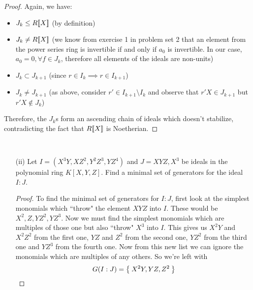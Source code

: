 \begin{problem}
\begin{enumerate}[(i)]
\begin{proof}
    Again, we have:
    \begin{itemize}
        \item \(J_k \leq R [\![X]\!]\) (by definition)
        \item \(J_k \neq R [\![X]\!]\) (we know from exercise 1 in problem set 2 that an element from the power series ring is invertible if and only if \(a_0\) is invertible. In our case, \(a_0 = 0, \forall f \in J_k\), therefore all elements of the ideals are non-units)
        \item \(J_k \subset J_{k + 1}\) (since \(r \in I_k \implies r \in I_{k + 1}\))
        \item \(J_k \neq J_{k + 1}\) (as above, consider \(r' \in I_{k + 1} \setminus I_k\) and observe that \(r' X \in J_{k + 1}\) but \(r' X \not\in J_k\))
    \end{itemize}
    
    Therefore, the \(J_k\)s form an ascending chain of ideals which doesn't stabilize, contradicting the fact that \(R [\![X]\!]\) is Noetherian.
    \end{proof}
\end{enumerate}
\end{problem}

\begin{problem}
~
\begin{enumerate}[(i)]
    \item[(ii)] Let \(I = (X^3 Y, X Z^2, Y^2 Z^3, Y Z^4)\) and \(J = XYZ, X^3\) be ideals in the polynomial ring \(K[X, Y, Z]\). Find a minimal set of generators for the ideal \(I : J\).
    \begin{proof}
    To find the minimal set of generators for \(I : J\), first look at the simplest monomials which ``throw" the element \(XYZ\) into \(I\). These would be \(X^2, Z, YZ^2, YZ^3\). Now we must find the simplest monomials which are multiples of those one but also ``throw" \(X^3\) into \(I\). This gives us \(X^2 Y\) and \(X^2 Z^2\) from the first one, \(YZ\) and \(Z^2\) from the second one, \(YZ^2\) from the third one and \(YZ^3\) from the fourth one. Now from this new list we can ignore the monomials which are multiples of any others. So we're left with
    \[
        G(I : J) = \Set{ X^2 Y, YZ, Z^2 }
    \]
    \end{proof}
\end{enumerate}
\end{problem}

